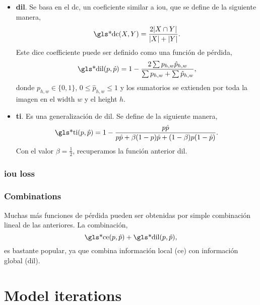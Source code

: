 \begin{itemize}
  \item \textbf{\gls*{dil}}. Se basa en el \gls{dc}, un coeficiente similar a
  \gls{iou}, que se define de la siguiente manera,
  \begin{equation}
    \text{\gls*{dc}}(X, Y) = \frac{2|X \cap Y|}{|X| + |Y|}.
  \end{equation}
  Este dice coefficiente puede ser definido como una función de pérdida,
  \begin{equation}
    \text{\gls*{dil}}(p, \hat{p})
    = 1 - \frac{2\sum p_{h, w}\hat{p}_{h, w}}{\sum p_{h, w} + \sum \hat{p}_{h, w}},
  \end{equation}
  donde \(p_{h, w} \in \{0, 1\}\), \(0 \leq \hat{p}_{h, w} \leq 1\) y los
  sumatorios se extienden por toda la imagen en el width \(w\) y el height
  \(h\).
  \item \textbf{\gls*{ti}}. Es una generalización de \gls{dil}. Se define de la
  siguiente manera,
  \begin{equation}
    \text{\gls*{ti}}(p, \hat{p})
    = 1 - \frac{p\hat{p}}{p\hat{p} + \beta(1 - p)\hat{p} + (1 - \beta)p(1 - \hat{p})}.
  \end{equation}
  Con el valor \(\beta = \frac{1}{2}\), recuperamos la función anterior
  \gls{dil}.
\end{itemize}


\subsubsection{\gls*{iou} loss}

\cite{yu16:unitb}


\subsubsection{Combinations}
Muchas más funciones de pérdida pueden ser obtenidas por simple combinación
lineal de las anteriores. La combinación,
\begin{equation}
  \text{\gls*{ce}}(p, \hat{p}) + \text{\gls*{dil}}(p, \hat{p}),
\end{equation}
es bastante popular, ya que combina información local (\gls{ce}) con
información global (\gls{dil}).


\section{Model iterations}

